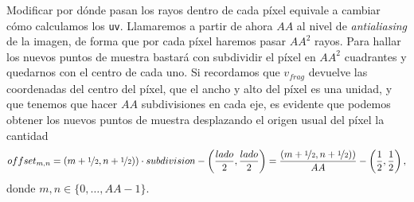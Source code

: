 Modificar por dónde pasan los rayos dentro de cada píxel equivale a cambiar cómo calculamos los \texttt{uv}. Llamaremos a partir de ahora $AA$ al nivel de \textit{antialiasing} de la imagen, de forma que por cada píxel haremos pasar $AA^2$ rayos. Para hallar los nuevos puntos de muestra bastará con subdividir el píxel en $AA^2$ cuadrantes y quedarnos con el centro de cada uno. Si recordamos que $v_{frag}$ devuelve las coordenadas del centro del píxel, que el ancho y alto del píxel es una unidad, y que tenemos que hacer $AA$ subdivisiones en cada eje, es evidente que podemos obtener los nuevos puntos de muestra desplazando el origen usual del píxel la cantidad
\begin{equation*}
    offset_{m,n} = (m+\nicefrac{1}{2},n+\nicefrac{1}{2}))\cdot subdivision - \left( \frac{lado}{2}, \frac{lado}{2}\right) = \frac{ (m+\nicefrac{1}{2},n+\nicefrac{1}{2}))}{AA} - \left( \frac{1}{2}, \frac{1}{2}\right),
\end{equation*}
donde $m,n\in \{0,\dots, AA-1\}$.\newline
